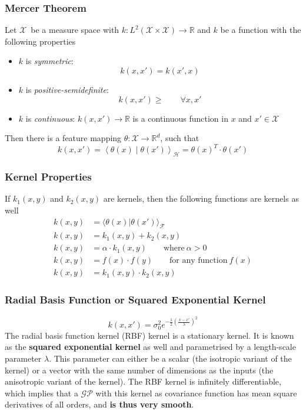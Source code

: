 \documentclass[11pt]{article}
\theoremstyle{definition}
\newcommand*\R{\mathbb{R}}
\newcommand*\X{\ensuremath{\mathcal{X}}}
\newcommand*\Hilbert{\ensuremath{\mathcal{H}}}
\begin{document}
\subsubsection{Mercer Theorem}
Let \X\ be a measure space with $k:L^2(\X\times\X)\rightarrow \R$ and $k$ be a function with the following properties
\begin{itemize}
	\item $k$ is \emph{symmetric}:
	\begin{equation*}
		k(x,x') = k(x',x)
	\end{equation*}
	\item $k$ is \emph{positive-semidefinite}:
	\begin{equation*}
		k(x,x') \geq\qquad \forall x,x'
	\end{equation*}
	\item $k$ is \emph{continuous}: $k(x,x') \rightarrow \R$ is a continuous function in $x$ and $x' \in \X$ 
\end{itemize}
Then there is a feature mapping $\theta : \X \rightarrow \R^d$, such that
\begin{equation*}
	k(x,x') = \left\langle \theta(x) \middle| \theta(x') \right\rangle_\Hilbert = \theta(x)^T \cdot \theta(x')
\end{equation*}

\subsubsection{Kernel Properties}
If $k_1(x,y)$ and $k_2(x,y)$ are kernels, then the following functions are kernels as well
\begin{align*}
	k(x,y) &= \langle\theta(x) | \theta(x')\rangle_{\mathcal{F}}\\
	k(x,y) &= k_1(x,y) + k_2(x,y)\\
	k(x,y) &= \alpha\cdot k_1(x,y)\qquad\text{where}\ \alpha>0\\
	k(x,y) &= f(x) \cdot f(y)\qquad\text{for any function}\ f(x)\\
	k(x,y) &= k_1(x,y) \cdot k_2(x,y)
\end{align*}

\subsubsection{Radial Basis Function or Squared Exponential Kernel}
\begin{equation*}
	k(x,x') = \sigma_0^2 e^{-\frac{1}{2}\left(\frac{x-x'}{\lambda}\right)^2}
\end{equation*}
The radial basis function kernel (RBF) kernel is a stationary kernel. It is known as the \textbf{squared exponential kernel} as well and parametrised by a length-scale parameter $\lambda$. This parameter can either be a scalar (the isotropic variant of the kernel) or a vector with the same number of dimensions as the inputs (the anisotropic variant of the kernel). The RBF kernel is infinitely differentiable, which implies that a $\mathcal{GP}$ with this kernel as covariance function has mean square derivatives of all orders, and \textbf{is thus very smooth}.
\end{document}
